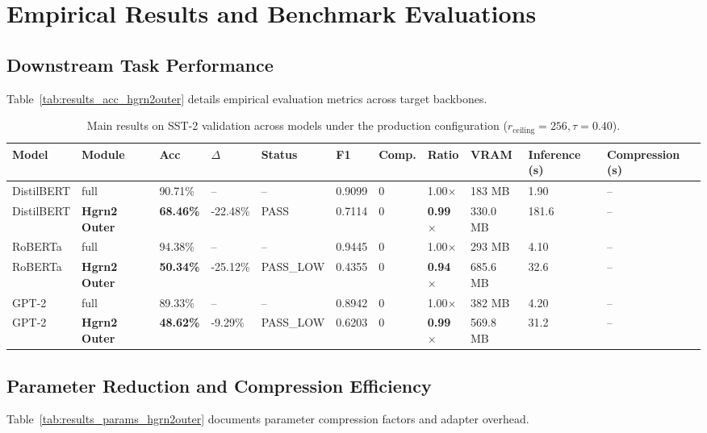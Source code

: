 \section{Empirical Results and Benchmark Evaluations}

\subsection{Downstream Task Performance}
Table~\ref{tab:results_acc_hgrn2outer} details empirical evaluation metrics across target backbones.

\begin{table}[t]
\centering
\small
\begin{tabular}{lllllllllll}
\toprule
\textbf{Model} & \textbf{Module} & \textbf{Acc} & \textbf{$\Delta$} & \textbf{Status} & \textbf{F1} & \textbf{Comp.} & \textbf{Ratio} & \textbf{VRAM} & \textbf{Inference (s)} & \textbf{Compression (s)} \\
\midrule
DistilBERT & full & 90.71\% & -- & -- & 0.9099 & 0 & 1.00$\times$ & 183 MB & 1.90 & -- \\
DistilBERT & \textbf{Hgrn2 Outer} & \textbf{68.46\%} & -22.48\% & PASS & 0.7114 & 0 & \textbf{0.99$\times$} & 330.0 MB & 181.6 & -- \\
RoBERTa & full & 94.38\% & -- & -- & 0.9445 & 0 & 1.00$\times$ & 293 MB & 4.10 & -- \\
RoBERTa & \textbf{Hgrn2 Outer} & \textbf{50.34\%} & -25.12\% & PASS_LOW & 0.4355 & 0 & \textbf{0.94$\times$} & 685.6 MB & 32.6 & -- \\
GPT-2 & full & 89.33\% & -- & -- & 0.8942 & 0 & 1.00$\times$ & 382 MB & 4.20 & -- \\
GPT-2 & \textbf{Hgrn2 Outer} & \textbf{48.62\%} & -9.29\% & PASS_LOW & 0.6203 & 0 & \textbf{0.99$\times$} & 569.8 MB & 31.2 & -- \\
\bottomrule
\end{tabular}
\caption{Main results on SST-2 validation across models under the production configuration ($r_{\mathrm{ceiling}}=256, \tau=0.40$).}
\label{tab:main_sst2}
\end{table}

\subsection{Parameter Reduction and Compression Efficiency}
Table~\ref{tab:results_params_hgrn2outer} documents parameter compression factors and adapter overhead.

